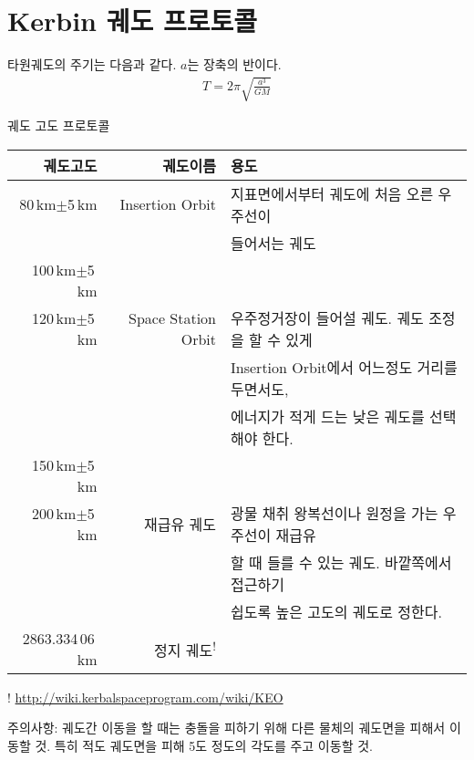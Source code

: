 \section{Kerbin 궤도 프로토콜}
타원궤도의 주기는 다음과 같다. $a$는 장축의 반이다.
\begin{align}
T = 2\pi \sqrt{\frac{a^3}{GM}}
\end{align}
\begin{adjustbox}{width=\textwidth}
\begin{threeparttable}
\caption{궤도 고도 프로토콜}
\begin{tabular}{|r|r|l|}
\hline
궤도고도 & 궤도이름& 용도
\\\hline
80\,km$\pm$5\,km&Insertion Orbit& 지표면에서부터 궤도에 처음 오른 우주선이 
\\&&들어서는 궤도
\\100\,km$\pm$5\,km&&
\\120\,km$\pm$5\,km&Space Station Orbit& 우주정거장이 들어설 궤도. 궤도 조정을 할 수 있게 
\\&&
Insertion Orbit에서 어느정도 거리를 두면서도,
\\&&
 에너지가 적게 드는 낮은 궤도를 선택해야 한다.
\\150\,km$\pm$5\,km&&
\\200\,km$\pm$5\,km&재급유 궤도& 광물 채취 왕복선이나 원정을 가는 우주선이 재급유
\\&&
 할 때 들를 수 있는 궤도. 바깥쪽에서 접근하기 
 \\&&
쉽도록 높은 고도의 궤도로 정한다.
\\2863.334\,06\,km&정지 궤도\textsuperscript{!}&
\\\hline
\end{tabular}
\begin{tablenotes}
\item[!] \url{http://wiki.kerbalspaceprogram.com/wiki/KEO}
\item[주의사항:] 궤도간 이동을 할 때는 충돌을 피하기 위해 다른 물체의 궤도면을 피해서 이동할 것. 특히 적도 궤도면을 피해 5도 정도의 각도를 주고 이동할 것.
\end{tablenotes}
\end{threeparttable}
\end{adjustbox}
